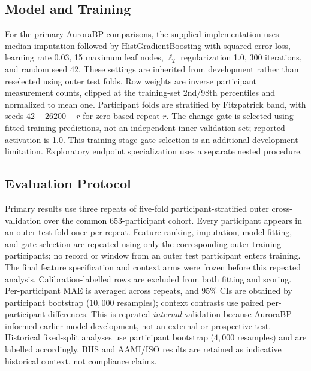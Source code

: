 \documentclass[12pt]{article}
\begin{document}
\subsection{Model and Training}
For the primary AuroraBP comparisons, the supplied implementation uses median imputation followed by HistGradientBoosting with squared-error loss, learning rate 0.03, 15 maximum leaf nodes, $\ell_2$ regularization 1.0, 300 iterations, and random seed 42. These settings are inherited from development rather than reselected using outer test folds. Row weights are inverse participant measurement counts, clipped at the training-set 2nd/98th percentiles and normalized to mean one. Participant folds are stratified by Fitzpatrick band, with seeds $42+26200+r$ for zero-based repeat $r$. The change gate is selected using fitted training predictions, not an independent inner validation set; reported activation is 1.0. This training-stage gate selection is an additional development limitation. Exploratory endpoint specialization uses a separate nested procedure.
\subsection{Evaluation Protocol}
\label{sec:evalprotocol}
Primary results use three repeats of five-fold participant-stratified outer cross-validation over the common 653-participant cohort. Every participant appears in an outer test fold once per repeat. Feature ranking, imputation, model fitting, and gate selection are repeated using only the corresponding outer training participants; no record or window from an outer test participant enters training. The final feature specification and context arms were frozen before this repeated analysis. Calibration-labelled rows are excluded from both fitting and scoring. Per-participant MAE is averaged across repeats, and 95\% CIs are obtained by participant bootstrap ($10{,}000$ resamples); context contrasts use paired per-participant differences. This is repeated \emph{internal} validation because AuroraBP informed earlier model development, not an external or prospective test. Historical fixed-split analyses use participant bootstrap ($4{,}000$ resamples) and are labelled accordingly. BHS and AAMI/ISO results are retained as indicative historical context, not compliance claims.
\end{document}
